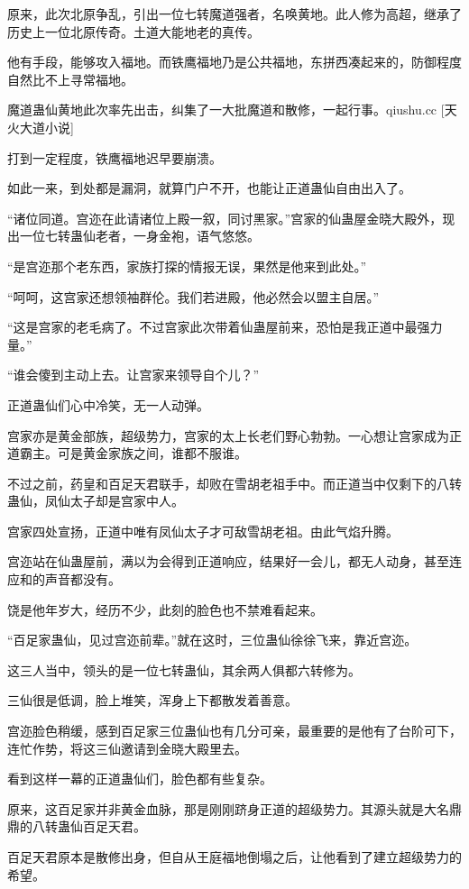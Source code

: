 \begin{this_body}
原来，此次北原争乱，引出一位七转魔道强者，名唤黄地。此人修为高超，继承了历史上一位北原传奇。土道大能地老的真传。

他有手段，能够攻入福地。而铁鹰福地乃是公共福地，东拼西凑起来的，防御程度自然比不上寻常福地。

魔道蛊仙黄地此次率先出击，纠集了一大批魔道和散修，一起行事。qiushu.cc [天火大道小说]

打到一定程度，铁鹰福地迟早要崩溃。

如此一来，到处都是漏洞，就算门户不开，也能让正道蛊仙自由出入了。

“诸位同道。宫迩在此请诸位上殿一叙，同讨黑家。”宫家的仙蛊屋金晓大殿外，现出一位七转蛊仙老者，一身金袍，语气悠悠。

“是宫迩那个老东西，家族打探的情报无误，果然是他来到此处。”

“呵呵，这宫家还想领袖群伦。我们若进殿，他必然会以盟主自居。”

“这是宫家的老毛病了。不过宫家此次带着仙蛊屋前来，恐怕是我正道中最强力量。”

“谁会傻到主动上去。让宫家来领导自个儿？”

正道蛊仙们心中冷笑，无一人动弹。

宫家亦是黄金部族，超级势力，宫家的太上长老们野心勃勃。一心想让宫家成为正道霸主。可是黄金家族之间，谁都不服谁。

不过之前，药皇和百足天君联手，却败在雪胡老祖手中。而正道当中仅剩下的八转蛊仙，凤仙太子却是宫家中人。

宫家四处宣扬，正道中唯有凤仙太子才可敌雪胡老祖。由此气焰升腾。

宫迩站在仙蛊屋前，满以为会得到正道响应，结果好一会儿，都无人动身，甚至连应和的声音都没有。

饶是他年岁大，经历不少，此刻的脸色也不禁难看起来。

“百足家蛊仙，见过宫迩前辈。”就在这时，三位蛊仙徐徐飞来，靠近宫迩。

这三人当中，领头的是一位七转蛊仙，其余两人俱都六转修为。

三仙很是低调，脸上堆笑，浑身上下都散发着善意。

宫迩脸色稍缓，感到百足家三位蛊仙也有几分可亲，最重要的是他有了台阶可下，连忙作势，将这三仙邀请到金晓大殿里去。

看到这样一幕的正道蛊仙们，脸色都有些复杂。

原来，这百足家并非黄金血脉，那是刚刚跻身正道的超级势力。其源头就是大名鼎鼎的八转蛊仙百足天君。

百足天君原本是散修出身，但自从王庭福地倒塌之后，让他看到了建立超级势力的希望。


\end{this_body}
